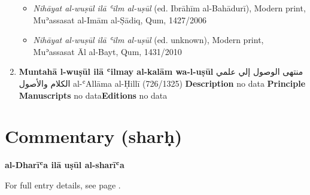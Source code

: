 \documentclass{article}
\begin{document}
\begin{enumerate}
\begin{itemize}
        \item \emph{Nihāyat al-wuṣūl ilā ʿilm al-uṣūl} (ed. Ibrāhīm al-Bahādurī), Modern print, Muʾassasat al-Imām al-Ṣādiq, Qum, 1427/2006
        
        \item \emph{Nihāyat al-wuṣūl ilā ʿilm al-uṣūl} (ed. unknown), Modern print, Muʾassasat Āl al-Bayt, Qum, 1431/2010
        \end{itemize}

      \item \textbf{Muntahā l-wuṣūl ilā ʿilmay al-kalām wa-l-uṣūl}
        \newline
        \textarabic{منتهى الوصول إلي علمي الكلام والأصول}
        \newline
        al-ʿAllāma al-Ḥillī
        \newline
        (726/1325)
        \newline
        \newline
        \textbf{Description}
        \newline	
        no data
        \newline
        \newline
    \textbf{Principle Manuscripts}
\newline
no data\newline\textbf{Editions}
\newline
no data\newline\end{enumerate}\section{Commentary (sharḥ)}
\textbf{al-Dharīʿa ilā uṣūl al-sharīʿa} 

For full entry details, see page \pageref{al-Dharīʿa ilā uṣūl al-sharīʿa}. \label{al-Dharīʿa ilā uṣūl al-sharīʿa commentary}
\end{document}
